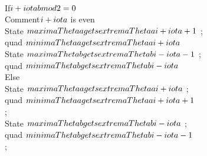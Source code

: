         \\If{$ i + \\iota \\bmod{2} = 0$}  \\Comment{$i + \\iota$ is even}
               \\State   $\\maximaTheta{a} \\gets \\extremaTheta{a}{i+\\iota+1}  $ ;\\quad
                 $\\minimaTheta{a}  \\gets \\extremaTheta{a}{i+\\iota} $ 
               \\State   $\\maximaTheta{b} \\gets \\extremaTheta{b}{i-\\iota-1} $ ;\\quad
                 $\\minimaTheta{b}  \\gets \\extremaTheta{b}{i-\\iota}  $
         \\Else
                \\State  $\\maximaTheta{a}  \\gets \\extremaTheta{a}{i+\\iota} $ ;\\quad
                 $\\minimaTheta{a}  \\gets \\extremaTheta{a}{i+\\iota+1}  $ \\;
                \\State  $\\maximaTheta{b} \\gets \\extremaTheta{b}{i-\\iota}  $ ;\\quad
                 $\\minimaTheta{b}  \\gets \\extremaTheta{b} {i-\\iota-1} $ \\;
